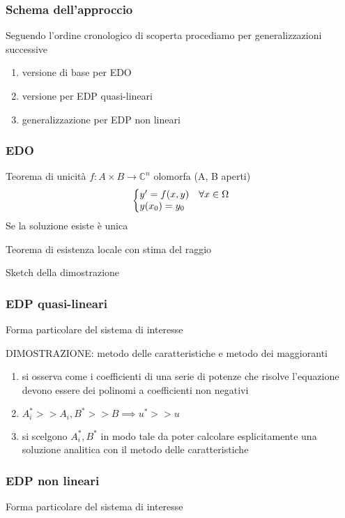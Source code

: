 \documentclass[serif,notheorems]{beamer}
\makeatletter
\theoremstyle{plain} %
\theoremstyle{definition} %
\theoremstyle{remark}
\newenvironment{system}%
{\left\lbrace\begin{array}{@{}l@{}}}%
{\end{array}\right.}
\makeatother
\begin{document}
\begin{frame}
\frametitle{Schema dell'approccio}
Seguendo l'ordine cronologico di scoperta procediamo per generalizzazioni successive
\begin{enumerate}
\item versione di base per EDO
\item versione per EDP quasi-lineari
\item generalizzazione per EDP non lineari
\end{enumerate}
\end{frame}


\begin{frame}
\frametitle{EDO}
Teorema di unicità $f:A\times B\rightarrow\mathbb{C}^n$ olomorfa (A, B aperti)
\begin{equation}
\begin{system}
y' = f(x,y) \quad \forall x \in \Omega \\
y(x_0)=y_0
\end{system}
\end{equation}
Se la soluzione esiste è unica
\end{frame}

\begin{frame}
Teorema di esistenza locale con stima del raggio
\end{frame}

\begin{frame}
Sketch della dimostrazione
\end{frame}

\begin{frame}
\frametitle{EDP quasi-lineari}
Forma particolare del sistema di interesse
\end{frame}

\begin{frame}
DIMOSTRAZIONE: metodo delle caratteristiche e metodo dei maggioranti
\begin{enumerate}
\item si osserva come i coefficienti di una serie di potenze che risolve l'equazione devono essere dei polinomi a coefficienti non negativi
\item $A_i^*>>A_i, B^*>>B \implies u^*>>u$
\item si scelgono $A_i^*, B^*$ in modo tale da poter calcolare esplicitamente una soluzione analitica con il metodo delle caratteristiche
\end{enumerate}
\end{frame}

\begin{frame}
\frametitle{EDP non lineari}
Forma particolare del sistema di interesse
\end{frame}
\end{document}
